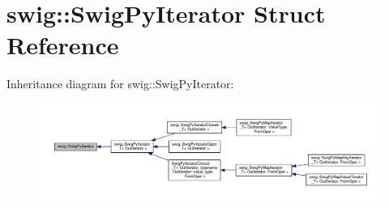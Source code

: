 \hypertarget{structswig_1_1SwigPyIterator}{}\section{swig\+:\+:Swig\+Py\+Iterator Struct Reference}
\label{structswig_1_1SwigPyIterator}


Inheritance diagram for swig\+:\+:Swig\+Py\+Iterator\+:\nopagebreak
\begin{figure}[H]
\begin{center}
\leavevmode
\includegraphics[width=350pt]{structswig_1_1SwigPyIterator__inherit__graph}
\end{center}
\end{figure}
